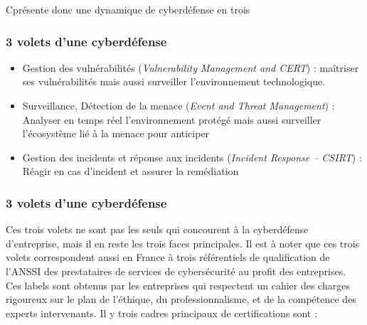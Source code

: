 C\edoc présente donc une dynamique de cyberdéfense en trois

\begin{frame}
\frametitle<presentation>{3 volets d'une cyberdéfense}


\begin{itemize}
\item Gestion des vulnérabilités (\textit{Vulnerability Management and CERT}) : maîtriser ses vulnérabilités mais aussi surveiller l’environnement technologique. 
\item Surveillance, Détection de la menace (\textit{Event and Threat Management}) : Analyser en temps réel l’environnement protégé mais aussi surveiller l’écosystème lié à la menace pour anticiper 
\item Gestion des incidents et réponse aux incidents (\textit{Incident Response – CSIRT}) : Réagir en cas d’incident et assurer la remédiation
\end{itemize}

\end{frame}


\begin{frame}
\frametitle<presentation>{3 volets d'une cyberdéfense}

\end{frame}

Ces trois volets ne sont pas les seuls qui concourent à la cyberdéfense d’entreprise, mais il en reste les trois faces principales. Il est à noter que ces trois volets correspondent aussi en France à trois référentiels de qualification de l’ANSSI des prestataires de services de cybersécurité au profit des entreprises. Ces labels sont obtenus par les entreprises qui respectent un cahier des charges rigoureux sur le plan de l'éthique, du professionnalisme, et de la compétence des experts intervenants. Il y trois cadres principaux de certifications sont :

